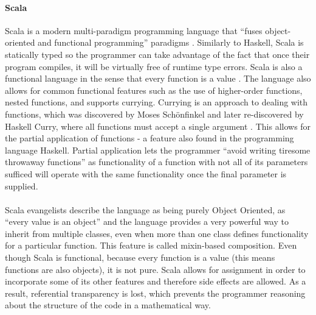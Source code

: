\documentclass[main.tex]{subfiles}
\begin{document}
{{%

\paragraph{Scala}Scala is a modern multi-paradigm programming language that ``fuses object-oriented and functional programming'' paradigms \cite{Odersky2004}. Similarly to Haskell, Scala is statically typed so the programmer can take advantage of the fact that once their program compiles, it will be virtually free of runtime type errors. Scala is also a functional language in the sense that every function is a value \cite{Odersky2008}. The language also allows for common functional features such as the use of higher-order functions, nested functions, and supports currying. Currying is an approach to dealing with functions, which was discovered by Moses Schönfinkel and later re-discovered by Haskell Curry, where all functions must accept a single argument \cite{Reynolds1998}. This allows for the partial application of functions - a feature also found in the programming language Haskell. Partial application lets the programmer ``avoid writing tiresome throwaway functions''\cite{OSullivan2008} as functionality of a function with not all of its parameters sufficed will operate with the same functionality once the final parameter is supplied.

\paragraph{}Scala evangelists describe the language as being purely Object Oriented, as ``every value is an object'' \cite{Scala2008} and the language provides a very powerful way to inherit from multiple classes, even when more than one class defines functionality for a particular function. This feature is called mixin-based composition. Even though Scala is functional, because every function is a value (this means functions are also objects), it is not pure. Scala allows for assignment in order to incorporate some of its other features and therefore side effects are allowed. As a result, referential transparency is lost, which prevents the programmer reasoning about the structure of the code in a mathematical way\cite{Odersky2008}.

}}
\end{document}
